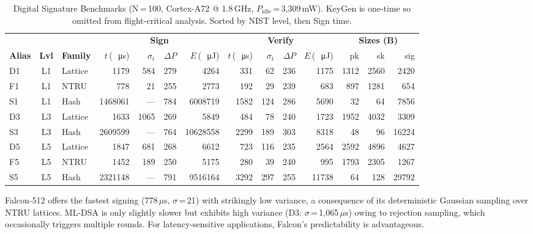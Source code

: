 \documentclass[conference]{IEEEtran}
\newcommand{\us}{\,\si{\micro\second}}
\newcommand{\uJ}{\,\si{\micro\joule}}
\begin{document}
\begin{table}[t]
\centering
\caption{Digital Signature Benchmarks (N\,=\,100, Cortex-A72 @ 1.8\,GHz, $P_{\text{idle}}$\,=\,3{,}309\,mW).
  KeyGen is one-time so omitted from flight-critical analysis.  Sorted by NIST level, then Sign time.}
\label{tab:sig}
\footnotesize
\setlength{\tabcolsep}{3pt}
\begin{tabular}{@{}l c l  r r r r  r r r r  r r r@{}}
\toprule
& & & \multicolumn{4}{c}{\textbf{Sign}} & \multicolumn{4}{c}{\textbf{Verify}} & \multicolumn{3}{c}{\textbf{Sizes (B)}} \\
\cmidrule(lr){4-7}\cmidrule(lr){8-11}\cmidrule(lr){12-14}
\textbf{Alias} & \textbf{Lvl} & \textbf{Family}
  & $t$\,(\si{\us}) & $\sigma_t$ & $\Delta P$ & $E$\,(\si{\uJ})
  & $t$\,(\si{\us}) & $\sigma_t$ & $\Delta P$ & $E$\,(\si{\uJ})
  & pk & sk & sig \\
\midrule
\rowcolor{lvlone}
D1 & L1 & Lattice
  & 1179 & 584 & 279 & 4264
  & 331 & 62 & 236 & 1175
  & 1312 & 2560 & 2420 \\
\rowcolor{lvlone}
F1 & L1 & NTRU
  & 778 & 21 & 255 & 2773
  & 192 & 29 & 239 & 683
  & 897 & 1281 & 654 \\
\rowcolor{lvlone}
S1 & L1 & Hash
  & 1468061 & --- & 784 & 6008719
  & 1582 & 124 & 286 & 5690
  & 32 & 64 & 7856 \\
\midrule
\rowcolor{lvlthree}
D3 & L3 & Lattice
  & 1633 & 1065 & 269 & 5849
  & 484 & 78 & 240 & 1723
  & 1952 & 4032 & 3309 \\
\rowcolor{lvlthree}
S3 & L3 & Hash
  & 2609599 & --- & 764 & 10628558
  & 2299 & 189 & 303 & 8318
  & 48 & 96 & 16224 \\
\midrule
\rowcolor{lvlfive}
D5 & L5 & Lattice
  & 1847 & 681 & 268 & 6612
  & 723 & 116 & 235 & 2564
  & 2592 & 4896 & 4627 \\
\rowcolor{lvlfive}
F5 & L5 & NTRU
  & 1452 & 189 & 250 & 5175
  & 280 & 39 & 240 & 995
  & 1793 & 2305 & 1267 \\
\rowcolor{lvlfive}
S5 & L5 & Hash
  & 2321148 & --- & 791 & 9516164
  & 3292 & 297 & 255 & 11738
  & 64 & 128 & 29792 \\
\bottomrule
\end{tabular}
\end{table}

Falcon-512 offers the fastest signing (778\,$\mu$s, $\sigma$\,=\,21)
with strikingly low variance, a consequence of its deterministic
Gaussian sampling over NTRU lattices.  ML-DSA is only slightly slower
but exhibits high variance (D3: $\sigma$\,=\,1{,}065\,$\mu$s) owing
to rejection sampling, which occasionally triggers multiple rounds.
For latency-sensitive applications, Falcon's predictability is
advantageous.
\end{document}
